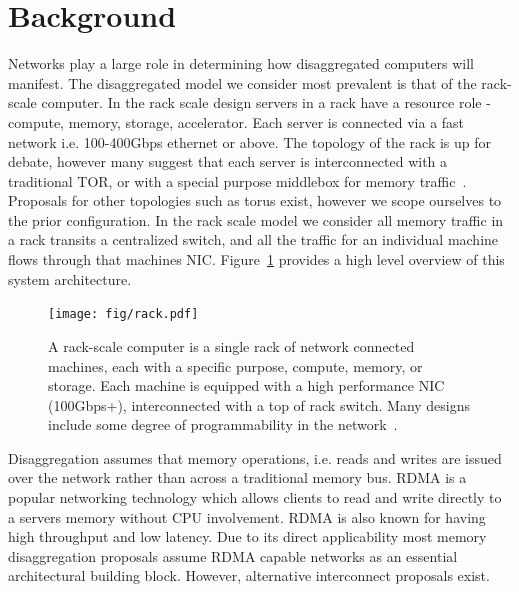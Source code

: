 
\section{Background}

Networks play a large role in determining how disaggregated computers will
manifest.  The disaggregated model we consider most prevalent is that of the
rack-scale computer. In the rack scale design servers in a rack have a resource
role - compute, memory, storage, accelerator. Each server is connected via a
fast network i.e. 100-400Gbps ethernet or above. The topology of the rack is up
for debate, however many suggest that each server is interconnected with a
traditional TOR, or with a special purpose middlebox for memory
traffic~\cite{disandapp}. Proposals for other topologies such as torus exist,
however we scope ourselves to the prior configuration. In the rack scale model
we consider all memory traffic in a rack transits a centralized switch, and all
the traffic for an individual machine flows through that machines NIC.
Figure~\ref{fig:rackscale} provides a high level overview of this system
architecture.

\begin{figure}[t]
    \begin{centering}
    \texttt{[image: fig/rack.pdf]}
    \caption{ A rack-scale computer is a single rack of network connected
    machines, each with a specific purpose, compute, memory, or storage. Each
    machine is equipped with a high performance NIC (100Gbps+), interconnected
    with a top of rack switch. Many designs include some degree of
    programmability in the network~\cite{disandapp}.
    }
    \label{fig:rackscale}
    \end{centering}
\end{figure}


Disaggregation assumes that memory operations, i.e. reads and writes are issued
over the network rather than across a traditional memory bus. RDMA is a popular
networking technology which allows clients to read and write directly to a
servers memory without CPU involvement. RDMA is also known for having high
throughput and low latency. Due to its direct applicability most memory
disaggregation proposals assume RDMA capable networks as an essential
architectural building block. However, alternative interconnect proposals exist.

